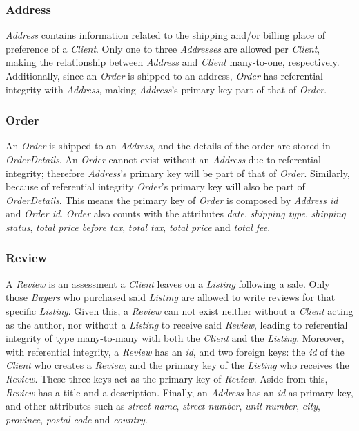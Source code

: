 \documentclass[11pt]{article}
\newcounter{use case ID}
\begin{document}
\subsubsection{Address}
\textit{Address} contains information related to the shipping and/or billing place of preference of a \textit{Client}. Only one to three \textit{Addresses} are allowed per \textit{Client}, making the relationship between \textit{Address} and \textit{Client} many-to-one, respectively. Additionally, since an \textit{Order} is shipped to an address, \textit{Order} has referential integrity with \textit{Address}, making \textit{Address}'s primary key part of that of \textit{Order}.

\subsubsection{Order}
An \textit{Order} is shipped to an \textit{Address}, and the details of the order are stored in \textit{OrderDetails}. An \textit{Order} cannot exist without an \textit{Address} due to referential integrity; therefore \textit{Address}'s primary key will be part of that of \textit{Order}. Similarly, because of referential integrity \textit{Order}'s primary key will also be part of \textit{OrderDetails}. This means the primary key of \textit{Order} is composed by \textit{Address id} and \textit{Order id}. \textit{Order} also counts with the attributes \textit{date}, \textit{shipping type}, \textit{shipping status}, \textit{total price before tax}, \textit{total tax}, \textit{total price} and \textit{total fee}.

\subsubsection{Review}
A \textit{Review} is an assessment a \textit{Client} leaves on a \textit{Listing} following a sale. Only those \textit{Buyers} who purchased said \textit{Listing} are allowed to write reviews for that specific \textit{Listing}. Given this, a \textit{Review} can not exist neither without a \textit{Client} acting as the author, nor without a \textit{Listing} to receive said \textit{Review}, leading to referential integrity of type many-to-many with both the \textit{Client} and the \textit{Listing}. Moreover, with referential integrity, a \textit{Review} has an \textit{id}, and two foreign keys: the \textit{id} of the \textit{Client} who creates a \textit{Review}, and the primary key of the \textit{Listing} who receives the \textit{Review}. These three keys act as the primary key of \textit{Review}. Aside from this, \textit{Review} has a title and a description. Finally, an \textit{Address} has an \textit{id} as primary key, and other attributes such as \textit{street name}, \textit{street number}, \textit{unit number}, \textit{city}, \textit{province}, \textit{postal code} and \textit{country}.
\end{document}

